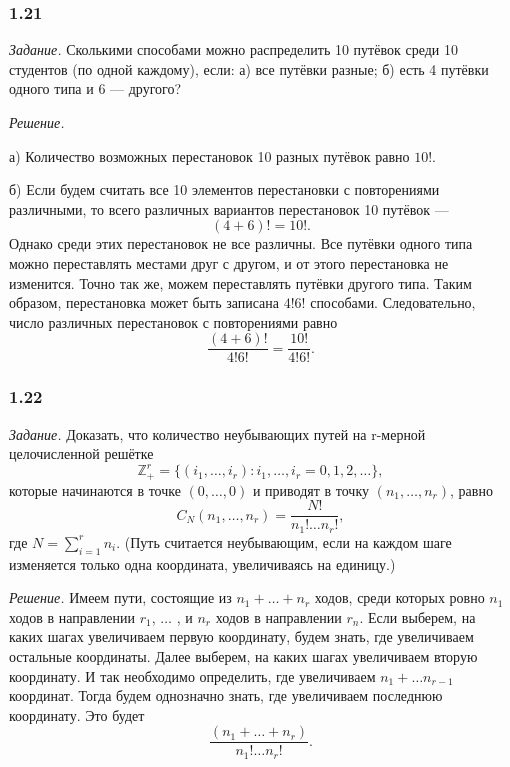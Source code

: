 \documentclass{book}
\begin{document}
\subsubsection*{1.21}

\textit{Задание.} Сколькими способами можно распределить 10 путёвок среди 10 студентов (по одной каждому), если: а) все путёвки разные; б) есть 4 путёвки одного типа и 6 --- другого?

\textit{Решение.}

а) Количество возможных перестановок 10 разных путёвок равно $10!$.

б) Если будем считать все 10 элементов перестановки с повторениями различными, то всего различных вариантов перестановок 10 путёвок ---
$$ ( 4 + 6 )! = 10!.$$
Однако среди этих перестановок не все различны.
Все путёвки одного типа можно переставлять местами друг с другом, и от этого перестановка не изменится.
Точно так же, можем переставлять путёвки другого типа.
Таким образом, перестановка может быть записана $4!6!$ способами.
Следовательно, число различных перестановок с повторениями равно
$$ \frac{ ( 4 + 6 )! }{ 4!6! } = \frac{10!}{4!6!}.$$

\subsubsection*{1.22}

\textit{Задание.} Доказать, что количество неубывающих путей на r-мерной целочисленной решётке
$$ \mathbb{Z}_+^r = \{ \left( i_1,  \dotsc , i_r \right) : i_1,  \dotsc , i_r = 0, 1, 2,  \dotsc \} ,$$
которые начинаются в точке $ \left( 0,  \dotsc , 0 \right) $ и приводят в точку $ \left( n_1,  \dotsc , n_r \right) $, равно
$$ C_N \left( n_1,  \dotsc , n_r \right) =
\frac{N!}{n_1! \dotsc n_r!},$$
где $ N = \sum \limits_{ i = 1 }^r n_i$.
(Путь считается неубывающим, если на каждом шаге изменяется только одна координата, увеличиваясь на единицу.)

\textit{Решение.} Имеем пути, состоящие из $ n_1 + \dotsc + n_r$ ходов,
среди которых ровно $n_1$ ходов в направлении $ r_1$,  $\dotsc$ , и $n_r$ ходов в направлении $r_n$.
Если выберем, на каких шагах увеличиваем первую координату, будем знать, где увеличиваем остальные координаты.
Далее выберем, на каких шагах увеличиваем вторую координату.
И так необходимо определить, где увеличиваем $ n_1+ \dotsc n_{r-1}$ координат.
Тогда будем однозначно знать, где увеличиваем последнюю координату.
Это будет
$$ \frac{ \left( n_1 + \dotsc + n_r \right) }{ n_1! \dotsc n_r! }.$$
\end{document}
